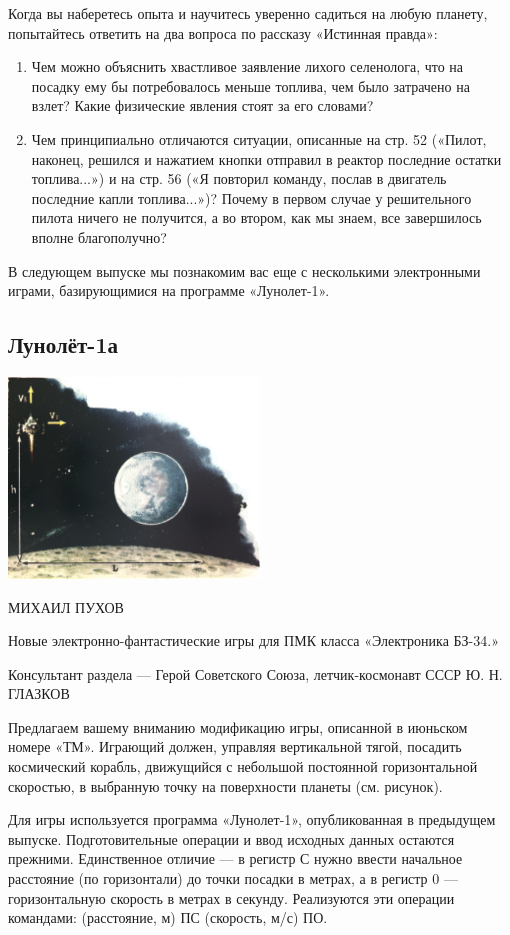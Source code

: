 \documentclass[11pt,a4paper,oneside]{article}
\begin{document}
Когда вы наберетесь опыта и научитесь уверенно садиться на любую планету, попытайтесь ответить на два вопроса по рассказу «Истинная правда»:
\begin{enumerate}
\item Чем можно объяснить хвастливое заявление лихого селенолога, что на посадку ему бы потребовалось меньше топлива, чем было затрачено на взлет? Какие физические явления стоят за его словами?
\item Чем принципиально отличаются ситуации, описанные на стр. 52 («Пилот, наконец, решился и нажатием кнопки отправил в реактор последние остатки топлива...») и на стр. 56 («Я повторил команду, послав в двигатель последние капли топлива...»)? Почему в первом случае у решительного пилота ничего не получится, а во втором, как мы знаем, все завершилось вполне благополучно?
\end{enumerate}

В следующем выпуске мы познакомим вас еще с несколькими электронными играми, базирующимися на программе «Лунолет-1».

\subsection{Лунолёт-1а}

\includegraphics[width=0.5\textwidth]{soft_land1}

МИХАИЛ ПУХОВ

Новые электронно-фантастические игры для ПМК класса «Электроника БЗ-34.»

Консультант раздела — Герой Советского Союза, летчик-космонавт СССР Ю. Н. ГЛАЗКОВ

Предлагаем вашему вниманию модификацию игры, описанной в июньском номере «ТМ». Играющий должен, управляя вертикальной тягой, посадить космический корабль, движущийся с небольшой постоянной горизонтальной скоростью, в выбранную точку на поверхности планеты (см. рисунок).

Для игры используется программа «Лунолет-1», опубликованная в предыдущем выпуске. Подготовительные операции и ввод исходных данных остаются прежними. Единственное отличие — в регистр С нужно ввести начальное расстояние (по горизонтали) до точки посадки в метрах, а в регистр 0 — горизонтальную скорость в метрах в секунду. Реализуются эти операции командами: (расстояние, м) ПС (скорость, м/с) ПО.
\end{document}
